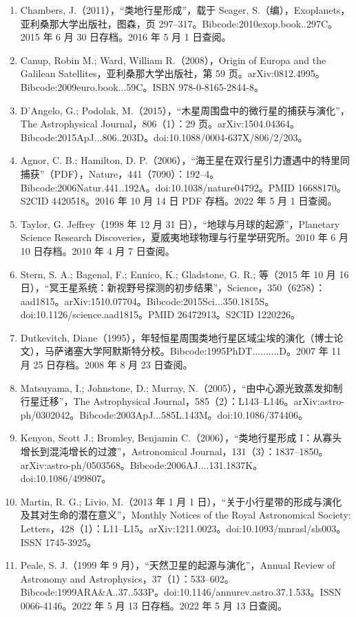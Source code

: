 \begin{enumerate}
\item Chambers, J.（2011），“类地行星形成”，载于 Seager, S.（编），Exoplanets，亚利桑那大学出版社，图森，页 297–317。Bibcode:2010exop.book..297C。2015 年 6 月 30 日存档。2016 年 5 月 1 日查阅。
\item Canup, Robin M.; Ward, William R.（2008），Origin of Europa and the Galilean Satellites，亚利桑那大学出版社，第 59 页。arXiv:0812.4995。Bibcode:2009euro.book...59C。ISBN 978-0-8165-2844-8。
\item D'Angelo, G.; Podolak, M.（2015），“木星周围盘中的微行星的捕获与演化”，The Astrophysical Journal，806（1）：29 页。arXiv:1504.04364。Bibcode:2015ApJ...806..203D。doi:10.1088/0004-637X/806/2/203。
\item Agnor, C. B.; Hamilton, D. P.（2006），“海王星在双行星引力遭遇中的特里同捕获”（PDF），Nature，441（7090）：192–4。Bibcode:2006Natur.441..192A。doi:10.1038/nature04792。PMID 16688170。S2CID 4420518。2016 年 10 月 14 日 PDF 存档。2022 年 5 月 1 日查阅。
\item Taylor, G. Jeffrey（1998 年 12 月 31 日），“地球与月球的起源”，Planetary Science Research Discoveries，夏威夷地球物理与行星学研究所。2010 年 6 月 10 日存档。2010 年 4 月 7 日查阅。
\item Stern, S. A.; Bagenal, F.; Ennico, K.; Gladstone, G. R.; 等（2015 年 10 月 16 日），“冥王星系统：新视野号探测的初步结果”，Science，350（6258）：aad1815。arXiv:1510.07704。Bibcode:2015Sci...350.1815S。doi:10.1126/science.aad1815。PMID 26472913。S2CID 1220226。
\item Dutkevitch, Diane（1995），年轻恒星周围类地行星区域尘埃的演化（博士论文），马萨诸塞大学阿默斯特分校。Bibcode:1995PhDT..........D。2007 年 11 月 25 日存档。2008 年 8 月 23 日查阅。
\item Matsuyama, I.; Johnstone, D.; Murray, N.（2005），“由中心源光致蒸发抑制行星迁移”，The Astrophysical Journal，585（2）：L143–L146。arXiv:astro-ph/0302042。Bibcode:2003ApJ...585L.143M。doi:10.1086/374406。
\item Kenyon, Scott J.; Bromley, Benjamin C.（2006），“类地行星形成 I：从寡头增长到混沌增长的过渡”，Astronomical Journal，131（3）：1837–1850。arXiv:astro-ph/0503568。Bibcode:2006AJ....131.1837K。doi:10.1086/499807。
\item Martin, R. G.; Livio, M.（2013 年 1 月 1 日），“关于小行星带的形成与演化及其对生命的潜在意义”，Monthly Notices of the Royal Astronomical Society: Letters，428（1）：L11–L15。arXiv:1211.0023。doi:10.1093/mnrasl/sls003。ISSN 1745-3925。
\item Peale, S. J.（1999 年 9 月），“天然卫星的起源与演化”，Annual Review of Astronomy and Astrophysics，37（1）：533–602。Bibcode:1999ARA&A..37..533P。doi:10.1146/annurev.astro.37.1.533。ISSN 0066-4146。2022 年 5 月 13 日存档。2022 年 5 月 13 日查阅。

\end{enumerate}
